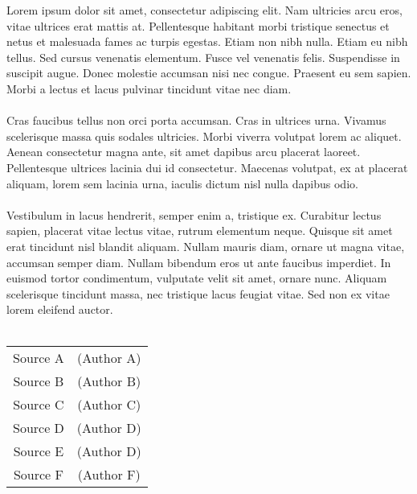 \documentclass[12pt, letterpaper]{article}
\begin{document}
Lorem ipsum dolor sit amet, consectetur adipiscing elit. Nam ultricies arcu eros, vitae ultrices erat mattis at. Pellentesque habitant morbi tristique senectus et netus et malesuada fames ac turpis egestas. Etiam non nibh nulla. Etiam eu nibh tellus. Sed cursus venenatis elementum. Fusce vel venenatis felis. Suspendisse in suscipit augue. Donec molestie accumsan nisi nec congue. Praesent eu sem sapien. Morbi a lectus et lacus pulvinar tincidunt vitae nec diam.\\
\vspace{1mm}\\
Cras faucibus tellus non orci porta accumsan. Cras in ultrices urna. Vivamus scelerisque massa quis sodales ultricies. Morbi viverra volutpat lorem ac aliquet. Aenean consectetur magna ante, sit amet dapibus arcu placerat laoreet. Pellentesque ultrices lacinia dui id consectetur. Maecenas volutpat, ex at placerat aliquam, lorem sem lacinia urna, iaculis dictum nisl nulla dapibus odio.\\
\vspace{1mm}\\
Vestibulum in lacus hendrerit, semper enim a, tristique ex. Curabitur lectus sapien, placerat vitae lectus vitae, rutrum elementum neque. Quisque sit amet erat tincidunt nisl blandit aliquam. Nullam mauris diam, ornare ut magna vitae, accumsan semper diam. Nullam bibendum eros ut ante faucibus imperdiet. In euismod tortor condimentum, vulputate velit sit amet, ornare nunc. Aliquam scelerisque tincidunt massa, nec tristique lacus feugiat vitae. Sed non ex vitae lorem eleifend auctor.\\
\vspace{1mm}\\
\begin{tabular}{@{}c c}
Source A & (Author A)\\
Source B & (Author B)\\
Source C & (Author C)\\
Source D & (Author D)\\
Source E & (Author D)\\
Source F & (Author F)\\

\end{tabular}
{\newpage}
\centering
\end{document}
